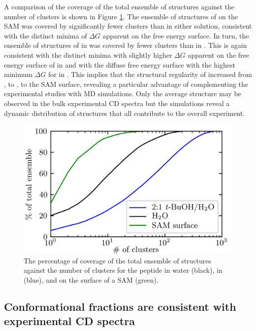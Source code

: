 A comparison of the coverage of the total ensemble of structures against the number of clusters is shown in Figure \ref{fig:helix-coverage}. 
The ensemble of structures of \pep{} on the SAM was covered by significantly fewer clusters than \pep{} in either solution, consistent with the distinct minima of $\Delta G$ apparent on the free energy surface. 
In turn, the ensemble of structures of \pep{} in  was covered by fewer clusters than \pep{} in \tbawat{}. 
This is again consistent with the distinct minima with slightly higher $\Delta G$ apparent on the free energy surface of \pep{} in  and with the diffuse free energy surface with the highest minimum $\Delta G$ for \pep{} in \tbawat{}. 
This implies that the structural regularity of \pep{} increased from \tbawat{}, to , to the SAM surface, revealing a particular advantage of complementing the experimental studies with MD simulations. 
Only the average structure may be observed in the bulk experimental CD spectra but the simulations reveal a dynamic distribution of structures that all contribute to the overall experiment. 

\begin{figure}
    \center
    \includegraphics[width=\single]{figures-helix/clust-size.png}
    \caption[Ensemble converage by conformational clusters]{
        The percentage of coverage of the total ensemble of structures against the number of clusters for the peptide in water (black), in \tbawat{} (blue), and on the surface of a SAM (green).
    }
    \label{fig:helix-coverage}
\end{figure}

\subsection{Conformational fractions are consistent with experimental CD spectra}

